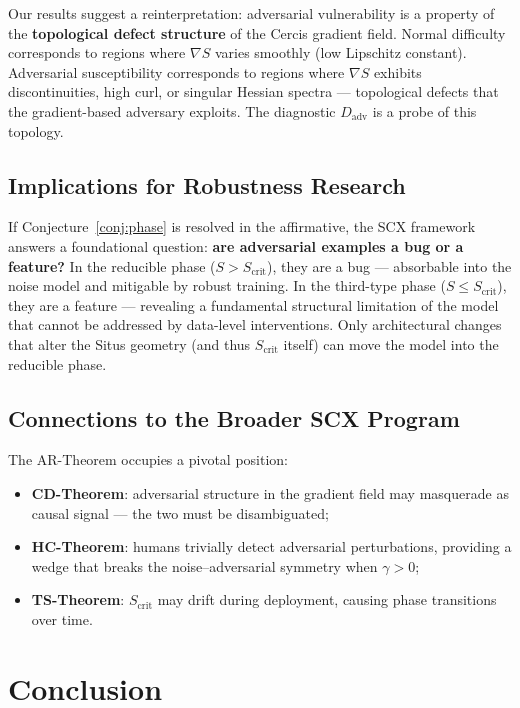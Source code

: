 \documentclass[12pt,a4paper]{article}
\begin{document}
Our results suggest a reinterpretation: adversarial vulnerability is a
property of the \textbf{topological defect structure} of the Cercis gradient
field.  Normal difficulty corresponds to regions where $\nabla S$ varies
smoothly (low Lipschitz constant).  Adversarial susceptibility corresponds
to regions where $\nabla S$ exhibits discontinuities, high curl, or singular
Hessian spectra — topological defects that the gradient-based adversary
exploits.  The diagnostic $D_{\mathrm{adv}}$ is a probe of this topology.

\subsection{Implications for Robustness Research}

If Conjecture~\ref{conj:phase} is resolved in the affirmative, the SCX
framework answers a foundational question: \textbf{are adversarial examples a
bug or a feature?}  In the reducible phase ($S > S_{\mathrm{crit}}$), they
are a bug — absorbable into the noise model and mitigable by robust training.
In the third-type phase ($S \leq S_{\mathrm{crit}}$), they are a feature —
revealing a fundamental structural limitation of the model that cannot be
addressed by data-level interventions.  Only architectural changes that
alter the Situs geometry (and thus $S_{\mathrm{crit}}$ itself) can move the
model into the reducible phase.

\subsection{Connections to the Broader SCX Program}

The AR-Theorem occupies a pivotal position:
\begin{itemize}
    \item \textbf{CD-Theorem}: adversarial structure in the gradient field
          may masquerade as causal signal — the two must be disambiguated;
    \item \textbf{HC-Theorem}: humans trivially detect adversarial
          perturbations, providing a wedge that breaks the
          noise--adversarial symmetry when $\gamma > 0$;
    \item \textbf{TS-Theorem}: $S_{\mathrm{crit}}$ may drift during
          deployment, causing phase transitions over time.
\end{itemize}

\section{Conclusion}
\end{document}

